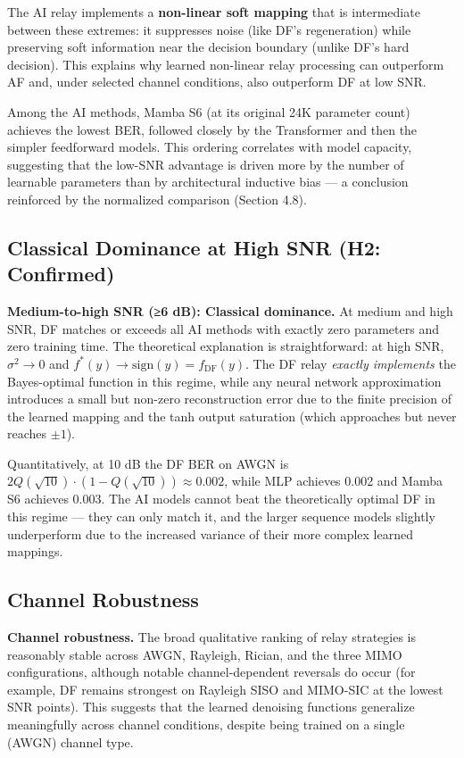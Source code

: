 The AI relay implements a \textbf{non-linear soft mapping} that is intermediate between these extremes: it suppresses noise (like DF's regeneration) while preserving soft information near the decision boundary (unlike DF's hard decision). This explains why learned non-linear relay processing can outperform AF and, under selected channel conditions, also outperform DF at low SNR.

Among the AI methods, Mamba S6 (at its original 24K parameter count) achieves the lowest BER, followed closely by the Transformer and then the simpler feedforward models. This ordering correlates with model capacity, suggesting that the low-SNR advantage is driven more by the number of learnable parameters than by architectural inductive bias --- a conclusion reinforced by the normalized comparison (Section 4.8).

\subsection{Classical Dominance at High SNR (H2: Confirmed)}\label{sec:classical-dominance-at-high-snr-h2-confirmed}

\textbf{Medium-to-high SNR (≥6 dB): Classical dominance.} At medium and high SNR, DF matches or exceeds all AI methods with exactly zero parameters and zero training time. The theoretical explanation is straightforward: at high SNR, \(\sigma^2 \to 0\) and \(f^*(y) \to \text{sign}(y) = f_{\text{DF}}(y)\). The DF relay \emph{exactly implements} the Bayes-optimal function in this regime, while any neural network approximation introduces a small but non-zero reconstruction error due to the finite precision of the learned mapping and the tanh output saturation (which approaches but never reaches \(\pm 1\)).

Quantitatively, at 10 dB the DF BER on AWGN is \(2Q(\sqrt{10}) \cdot (1 - Q(\sqrt{10})) \approx 0.002\), while MLP achieves 0.002 and Mamba S6 achieves 0.003. The AI models cannot beat the theoretically optimal DF in this regime --- they can only match it, and the larger sequence models slightly underperform due to the increased variance of their more complex learned mappings.

\subsection{Channel Robustness}\label{sec:channel-robustness}

\textbf{Channel robustness.} The broad qualitative ranking of relay strategies is reasonably stable across AWGN, Rayleigh, Rician, and the three MIMO configurations, although notable channel-dependent reversals do occur (for example, DF remains strongest on Rayleigh SISO and MIMO-SIC at the lowest SNR points). This suggests that the learned denoising functions generalize meaningfully across channel conditions, despite being trained on a single (AWGN) channel type.

